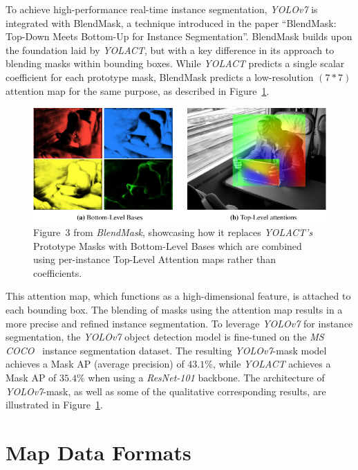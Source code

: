 To achieve high-performance real-time instance segmentation, \textit{YOLOv7} is integrated with BlendMask, a technique introduced in the paper \enquote{BlendMask: Top-Down Meets Bottom-Up for Instance Segmentation}.
BlendMask builds upon the foundation laid by \textit{YOLACT}, but with a key difference in its approach to blending masks within bounding boxes.
While \textit{YOLACT} predicts a single scalar coefficient for each prototype mask, BlendMask predicts a low-resolution $(7*7)$ attention map for the same purpose, as described in Figure~\ref{fig:blendmask}.

\begin{figure}[htb]
    \includegraphics[width=\linewidth]{figures/blendmask_fig_3-cropped}
    \caption{Figure~3 from \textit{BlendMask}, showcasing how it replaces \textit{YOLACT's} Prototype Masks with Bottom-Level Bases which are combined using per-instance Top-Level Attention maps rather than coefficients.}
    \label{fig:blendmask}
\end{figure}

This attention map, which functions as a high-dimensional feature, is attached to each bounding box.
The blending of masks using the attention map results in a more precise and refined instance segmentation.
To leverage \textit{YOLOv7} for instance segmentation, the \textit{YOLOv7} object detection model is fine-tuned on the \textit{MS COCO}~\cite{lin2014microsoft} instance segmentation dataset.
The resulting \textit{YOLOv7}-mask model achieves a Mask AP (average precision) of $43.1\%$, while \textit{YOLACT} achieves a Mask AP of $35.4\%$ when using a \textit{ResNet-101} backbone.
The architecture of \textit{YOLOv7}-mask, as well as some of the qualitative corresponding results, are illustrated in Figure~\ref{fig:blendmask}.


\section{Map Data Formats}
\label{sec:opendrive}

